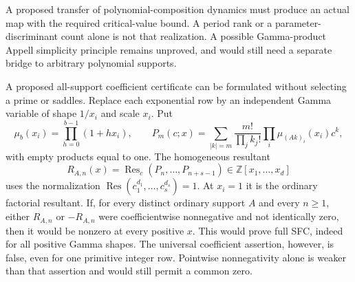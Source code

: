 \documentclass[11pt]{article}
\begin{document}
A proposed transfer of polynomial-composition dynamics must produce
an actual map with the required critical-value bound. A period rank
or a parameter-discriminant count alone is not that realization.
A possible Gamma-product Appell simplicity principle remains unproved,
and would still need a separate bridge to arbitrary polynomial supports.

A proposed all-support coefficient certificate can be formulated without selecting
a prime or saddles. Replace each exponential row by an independent
Gamma variable of shape $1/x_i$ and scale $x_i$. Put
\[
 \mu_b(x_i)=\prod_{h=0}^{b-1}(1+h x_i),\qquad
 P_m(c;x)=\sum_{|k|=m}\frac{m!}{\prod_jk_j!}
                  \prod_i\mu_{(Ak)_i}(x_i)c^k,
\]
with empty products equal to one. The homogeneous resultant
\[
 R_{A,n}(x)=\operatorname{Res}_c(P_n,\ldots,P_{n+s-1})
                  \in\mathbb Z[x_1,\ldots,x_d]
\]
uses the normalization
$\operatorname{Res}(c_1^{d_1},\ldots,c_s^{d_s})=1$.
At $x_i=1$ it is the ordinary factorial resultant. If, for every
distinct ordinary support $A$ and every $n\ge1$, either $R_{A,n}$ or
$-R_{A,n}$ were coefficientwise nonnegative and not identically zero,
then it would be nonzero at every positive $x$. This would prove full
SFC, indeed for all positive Gamma shapes. The universal coefficient
assertion, however, is false, even for one primitive integer row.
Pointwise nonnegativity alone is weaker than that assertion and
would still permit a common zero.
\end{document}
